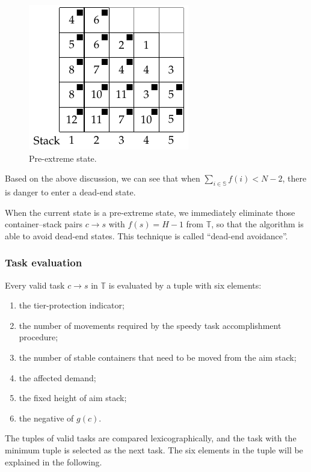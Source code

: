 \documentclass[review,3p,times,12pt,number]{elsarticle}\usepackage{amsmath}\usepackage{amssymb}
\begin{document}
\begin{figure}[htbp]
\centering
\includegraphics{figs/c.pdf}
\caption{Pre-extreme state.}
\label{fig:pre-extreme}
\end{figure}

Based on the above discussion, we can see that when $\sum_{i\in\mathbb{S}}f(i)<N-2$, there is danger to enter a dead-end state.

When the current state is a pre-extreme state, we immediately eliminate those container--stack pairs $c\rightarrow s$ with $f(s)=H-1$ from $\mathbb T$, so that the algorithm is able to avoid dead-end states. This technique is called ``dead-end avoidance''.

\subsubsection{Task evaluation}

Every valid task $c\rightarrow s$ in $\mathbb{T}$ is evaluated by a tuple with six elements:
\begin{enumerate}
\item the tier-protection indicator;
\item the number of movements required by the speedy task accomplishment procedure;
\item the number of stable containers that need to be moved from the aim stack;
\item the affected demand;
\item the fixed height of aim stack;
\item the negative of $g(c)$.
\end{enumerate}
The tuples of valid tasks are compared lexicographically, and the task with the minimum tuple is selected as the next task. The six elements in the tuple will be explained in the following.
\end{document}
